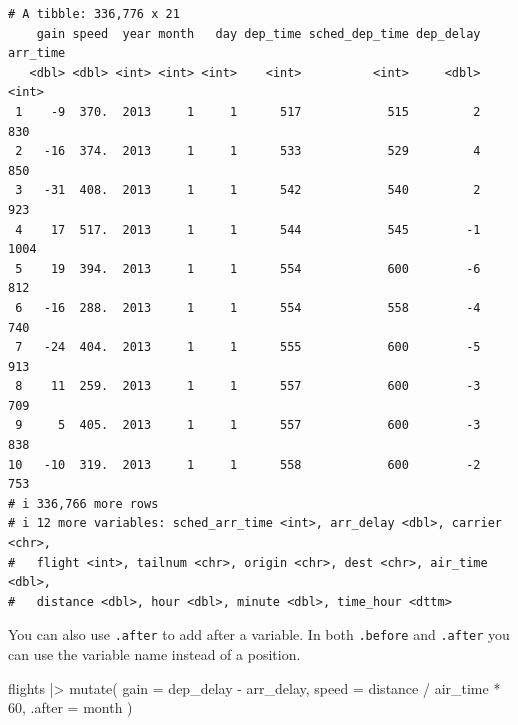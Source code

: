 \documentclass[
  letterpaper,
  DIV=11,
  numbers=noendperiod]{scrreprt}
\newenvironment{Shaded}{\begin{snugshade}}{\end{snugshade}}
\newcommand{\AttributeTok}[1]{\textcolor[rgb]{0.40,0.45,0.13}{#1}}
\newcommand{\DecValTok}[1]{\textcolor[rgb]{0.68,0.00,0.00}{#1}}
\newcommand{\FunctionTok}[1]{\textcolor[rgb]{0.28,0.35,0.67}{#1}}
\newcommand{\NormalTok}[1]{\textcolor[rgb]{0.00,0.23,0.31}{#1}}
\newcommand{\SpecialCharTok}[1]{\textcolor[rgb]{0.37,0.37,0.37}{#1}}
\begin{document}
\begin{verbatim}
# A tibble: 336,776 x 21
    gain speed  year month   day dep_time sched_dep_time dep_delay arr_time
   <dbl> <dbl> <int> <int> <int>    <int>          <int>     <dbl>    <int>
 1    -9  370.  2013     1     1      517            515         2      830
 2   -16  374.  2013     1     1      533            529         4      850
 3   -31  408.  2013     1     1      542            540         2      923
 4    17  517.  2013     1     1      544            545        -1     1004
 5    19  394.  2013     1     1      554            600        -6      812
 6   -16  288.  2013     1     1      554            558        -4      740
 7   -24  404.  2013     1     1      555            600        -5      913
 8    11  259.  2013     1     1      557            600        -3      709
 9     5  405.  2013     1     1      557            600        -3      838
10   -10  319.  2013     1     1      558            600        -2      753
# i 336,766 more rows
# i 12 more variables: sched_arr_time <int>, arr_delay <dbl>, carrier <chr>,
#   flight <int>, tailnum <chr>, origin <chr>, dest <chr>, air_time <dbl>,
#   distance <dbl>, hour <dbl>, minute <dbl>, time_hour <dttm>
\end{verbatim}

You can also use \texttt{.after} to add after a variable. In both
\texttt{.before} and \texttt{.after} you can use the variable name
instead of a position.

\begin{Shaded}
\begin{Highlighting}[]
\NormalTok{flights }\SpecialCharTok{|\textgreater{}}
  \FunctionTok{mutate}\NormalTok{(}
    \AttributeTok{gain =}\NormalTok{ dep\_delay }\SpecialCharTok{{-}}\NormalTok{ arr\_delay,}
    \AttributeTok{speed =}\NormalTok{ distance }\SpecialCharTok{/}\NormalTok{ air\_time }\SpecialCharTok{*} \DecValTok{60}\NormalTok{,}
    \AttributeTok{.after =}\NormalTok{ month}
\NormalTok{  )}
\end{Highlighting}
\end{Shaded}
\end{document}
